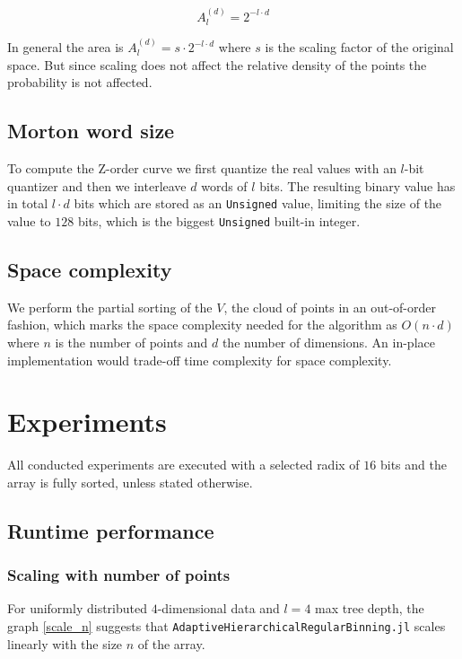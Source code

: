 \documentclass{juliacon}
\begin{document}
$$A^{(d)}_l = 2^{-l \cdot d}$$

In general the area is $A^{(d)}_l = s\cdot 2^{-l \cdot d}$ where $s$ is the scaling factor
of the original space. But since scaling does not affect the relative density of the
points the probability is not affected.

\subsection{Morton word size}
To compute the Z-order curve we first quantize the real values with an $l$-bit
quantizer and then we interleave $d$ words of $l$ bits. The resulting binary value has in
total $l\cdot d$ bits which are stored as an \verb|Unsigned| value, limiting the size of the
value to $128$ bits, which is the biggest \verb|Unsigned| built-in integer.

\subsection{Space complexity}
We perform the partial sorting of the $V$, the cloud of points in an out-of-order fashion,
which marks the space complexity needed for the algorithm as $O(n\cdot d)$ where $n$ is
the number of points and $d$ the number of dimensions. An in-place implementation would
trade-off time complexity for space complexity.


\section{Experiments}
All conducted experiments are executed with a selected radix of $16$ bits and the array
is fully sorted, unless stated otherwise.


\subsection{Runtime performance}
\subsubsection{Scaling with number of points}
For uniformly distributed $4$-dimensional data and $l=4$ max tree depth, the graph
\ref{scale_n} suggests that \verb|AdaptiveHierarchicalRegularBinning.jl| scales
linearly with the size $n$ of the array.
\end{document}
